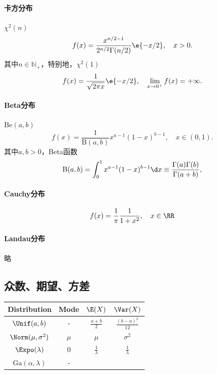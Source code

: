 \paragraph{卡方分布}

$\chi^2(n)$
\begin{equation}
	f(x)=\frac{x^{n/2-1}}{2^{n/2}\Gamma(n/2)}\e{-x/2},\quad x>0.
\end{equation}
其中$n\in\mathbb N_+$，特别地，$\chi^2(1)$
\[
	f(x)=\frac1{\sqrt{2\pi x}}\e{-x/2},\quad\lim_{x\to 0^+}f(x)=+\infty.
\]

\paragraph{Beta分布}

$\mathrm{Be}(a,b)$
\begin{equation}
	f(x)=\frac1{\mathrm B(a,b)}x^{a-1}(1-x)^{b-1},\quad x\in(0,1).
\end{equation}
其中$a,b>0$，Beta函数
\[
	\mathrm B(a,b)=\int_0^1x^{a-1}(1-x)^{b-1}\d x\equiv\frac{\Gamma(a)\Gamma(b)}{\Gamma(a+b)},
\]

\paragraph{Cauchy分布}

\begin{equation}
	f(x)=\frac1\pi\frac1{1+x^2},\quad x\in\RR
\end{equation}

\paragraph{Landau分布}

略

\subsection{众数、期望、方差}

\begin{center}
	\begin{tabular}{cccc}
		\toprule
		Distribution&Mode&$\E(X)$&$\Var(X)$\\
		\midrule
		$\Unif(a,b)$&-&$\frac{a+b}2$&$\frac{(b-a)^2}{12}$\\
		$\Norm(\mu,\sigma^2)$&$\mu$&$\mu$&$\sigma^2$\\
		$\Expo(\lambda)$&0&$\frac1\lambda$&$\frac1\lambda$\\
		$\mathrm{Ga}(\alpha,\lambda)$&-&&\\
		\bottomrule
	\end{tabular}
\end{center}

